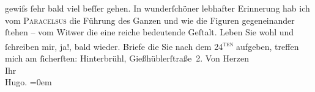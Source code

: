 \begin{ledgroupsized}[t]{13cm}
               gewiſs ſehr bald viel beſſer gehen.\pend
           \pstart
           In wunderſchöner lebhafter Erinnerung hab ich vom \textsc{Paracelsus} die Führung des Ganzen und wie die Figuren gegeneinander ſtehen – vom Witwer die eine reiche bedeutende Geſtalt. {\pb}Leben Sie wohl und ſchreiben mir,
               ja!, bald wieder.\pend
           \pstart
           Briefe die Sie nach dem 24\textsuperscript{\textsc{ten}} aufgeben, treffen mich am ſicherſten: Hinterbrühl, Gießhüblerſtraße 2.\pend
           \pstart
           Von Herzen{\\[\baselineskip]}Ihr{\\[\baselineskip]}\spacefill\mbox{Hugo.}\pend
           \leftskip=0em{}
         
         \endnumbering{}\end{ledgroupsized}  \newcommand{\dateiname}{L00825}\newcommand{\titel}{Hugo von Hofmannsthal an Arthur Schnitzler, 19. [7. 1898]}\newcommand{\editorInnen}{Martin Anton Müller und Gerd-Hermann Susen}
      